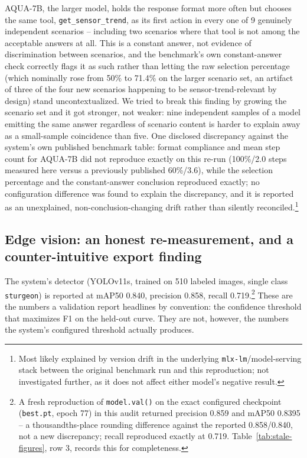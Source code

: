 AQUA-7B, the larger model, holds the response format more often but chooses the same tool,
\texttt{get\_sensor\_trend}, as its first action in every one of 9 genuinely independent scenarios
-- including two scenarios where that tool is not among the acceptable answers at all. This is a
constant answer, not evidence of discrimination between scenarios, and the benchmark's own
constant-answer check correctly flags it as such rather than letting the raw selection percentage
(which nominally rose from 50\% to 71.4\% on the larger scenario set, an artifact of three of the
four new scenarios happening to be sensor-trend-relevant by design) stand uncontextualized. We tried
to break this finding by growing the scenario set and it got stronger, not weaker: nine independent
samples of a model emitting the same answer regardless of scenario content is harder to explain
away as a small-sample coincidence than five. One disclosed discrepancy against the system's own
published benchmark table: format compliance and mean step count for AQUA-7B did not reproduce
exactly on this re-run (100\%/2.0 steps measured here versus a previously published 60\%/3.6),
while the selection percentage and the constant-answer conclusion reproduced exactly; no
configuration difference was found to explain the discrepancy, and it is reported as an unexplained,
non-conclusion-changing drift rather than silently reconciled.\footnote{Most likely explained by
version drift in the underlying \texttt{mlx-lm}/model-serving stack between the original benchmark
run and this reproduction; not investigated further, as it does not affect either model's negative
result.}

\subsection{Edge vision: an honest re-measurement, and a counter-intuitive export finding}
\label{sec:results-vision}

The system's detector (YOLOv11s, trained on 510 labeled images, single class \texttt{sturgeon}) is
reported at mAP50 0.840, precision 0.858, recall 0.719.\footnote{A fresh reproduction of
\texttt{model.val()} on the exact configured checkpoint (\texttt{best.pt}, epoch 77) in this audit
returned precision 0.859 and mAP50 0.8395 -- a thousandths-place rounding difference against the
reported 0.858/0.840, not a new discrepancy; recall reproduced exactly at 0.719. Table~\ref{tab:stale-figures}, row 3, records this for completeness.} These are the numbers a
validation report headlines by convention: the confidence threshold that maximizes F1 on the
held-out curve. They are not, however, the numbers the system's configured threshold actually
produces.

